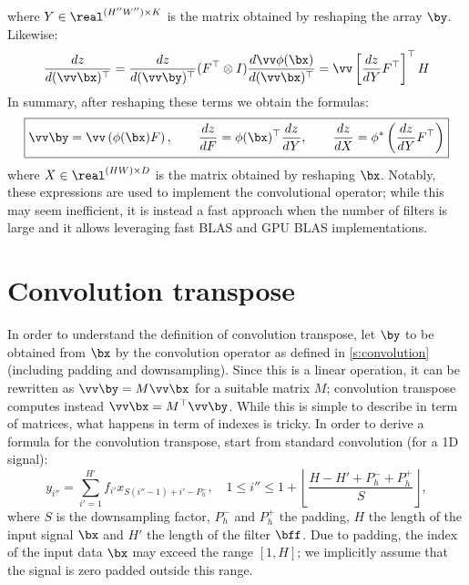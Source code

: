 where $Y\in\real^{(H''W'')\times K}$ is the matrix obtained by reshaping the array $\by$. Likewise:
\[
\frac{dz}{d(\vv \bx)^\top}
=
\frac{dz}{d(\vv\by)^\top}
(F^\top \otimes I)
\frac{d\vv \phi(\bx)}{d(\vv \bx)^\top}
=
\vv\left[ 
\frac{dz}{dY}
F^\top
\right]^\top
H
\]
In summary, after reshaping these terms we obtain the formulas:
\[
\boxed{
\vv\by = 
 \vv\left(\phi(\bx) F\right),
\qquad
\frac{dz}{dF}
=
\phi(\bx)^\top\frac{d z}{d Y},
\qquad
\frac{d z}{d X}
=
\phi^*\left(
\frac{d z}{d Y}F^\top
\right)
}
\]
where $X\in\real^{(HW)\times D}$ is the matrix obtained by reshaping $\bx$. Notably, these expressions are used to implement the convolutional operator; while this may seem inefficient, it is instead a fast approach when the number of filters is large and it allows leveraging fast BLAS and GPU BLAS implementations.

\section{Convolution transpose}\label{s:impl-convolution-transpose}

In order to understand the definition of convolution transpose, let $\by$ to be obtained from $\bx$ by the convolution operator as defined in \cref{s:convolution} (including padding and downsampling).  Since this is a linear operation, it can be rewritten as $\vv \by = M \vv\bx$ for a suitable matrix $M$; convolution transpose computes instead $\vv \bx = M^\top \vv \by$.  While this is simple to describe in term of matrices, what happens in term of indexes is tricky. In order to derive a formula for the convolution transpose, start from standard convolution (for a 1D signal):
\[
   y_{i''} = \sum_{i'=1}^{H'} f_{i'} x_{S (i''-1) + i' - P_h^-}, 
   \quad
    1 \leq i'' \leq 1 + \left\lfloor \frac{H - H' + P_h^- + P_h^+}{S} \right\rfloor,
\]
where $S$ is the downsampling factor, $P_h^-$ and $P_h^+$ the padding, $H$ the length of the input signal $\bx$ and $H'$ the length of the filter $\bff$. Due to padding, the index of the input data $\bx$ may exceed the range $[1,H]$; we implicitly assume that the signal is zero padded outside this range.

